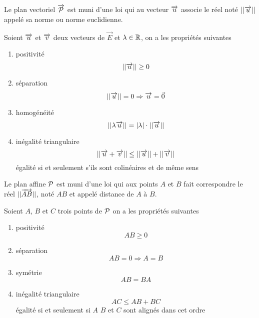 Le plan vectoriel $\vect{\P}$ est muni d'une loi qui au vecteur $\vu$ associe le 
réel noté $||\vu||$ appelé sa norme ou norme euclidienne.
\begin{prop}
  Soient $\vu$ et $\vv$ deux vecteurs de $\vec{E}$ et $\lambda \in \R$, on a les 
  propriétés suivantes
  \begin{enumerate}
    \item positivité
      \begin{equation}
        ||\vu|| \geq 0
      \end{equation}
    \item séparation
      \begin{equation}
        ||\vu|| = 0 \Rightarrow \vu = \vec{0}
      \end{equation}
    \item homogénéité
      \begin{equation}
        ||\lambda \vu||=|\lambda| \cdot ||\vu||
      \end{equation}
    \item inégalité triangulaire
      \begin{equation}
        ||\vu+\vv|| \leq ||\vu|| + ||\vv||
      \end{equation}
      égalité si et seulement s'ils sont colinéaires et de même sens
  \end{enumerate}
\end{prop}
Le plan affine $\P$ est muni d'une loi qui aux points $A$ et $B$ fait 
correspondre le réel $||\vect{AB}||$, noté $AB$ et appelé distance de $A$ à $B$.
\begin{prop}
  Soient $A$, $B$ et $C$ trois points de $\P$ on a les propriétés suivantes
  \begin{enumerate}
    \item positivité
      \begin{equation}
        AB \geq 0
      \end{equation}
    \item séparation
      \begin{equation}
        AB = 0 \Rightarrow A=B
      \end{equation}
    \item symétrie
      \begin{equation}
        AB=BA
      \end{equation}
    \item inégalité triangulaire
      \begin{equation}
        AC \leq AB + BC
      \end{equation}
      égalité si et seulement si $A$ $B$ et $C$ sont alignés dans cet ordre
  \end{enumerate}
\end{prop}

